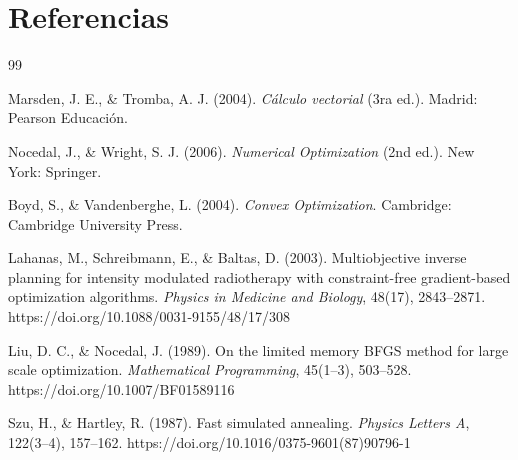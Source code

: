 \section{Referencias}

{
\renewcommand{\section}[2]{}

\begin{thebibliography}{99}

Marsden, J. E., \& Tromba, A. J. (2004).
\textit{Cálculo vectorial} (3ra ed.).
Madrid: Pearson Educación.

Nocedal, J., \& Wright, S. J. (2006).
\textit{Numerical Optimization} (2nd ed.).
New York: Springer.

Boyd, S., \& Vandenberghe, L. (2004).
\textit{Convex Optimization}.
Cambridge: Cambridge University Press.

Lahanas, M., Schreibmann, E., \& Baltas, D. (2003).
Multiobjective inverse planning for intensity modulated radiotherapy with constraint-free gradient-based optimization algorithms.
\textit{Physics in Medicine and Biology}, 48(17), 2843--2871.
https://doi.org/10.1088/0031-9155/48/17/308

Liu, D. C., \& Nocedal, J. (1989).
On the limited memory BFGS method for large scale optimization.
\textit{Mathematical Programming}, 45(1--3), 503--528.
https://doi.org/10.1007/BF01589116

Szu, H., \& Hartley, R. (1987).
Fast simulated annealing.
\textit{Physics Letters A}, 122(3--4), 157--162.
https://doi.org/10.1016/0375-9601(87)90796-1

\end{thebibliography}

}